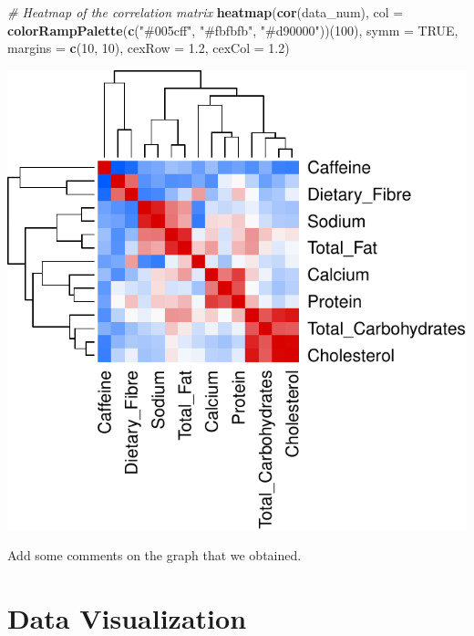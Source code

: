 \documentclass[
]{article}
\newenvironment{Shaded}{\begin{snugshade}}{\end{snugshade}}
\newcommand{\AttributeTok}[1]{\textcolor[rgb]{0.13,0.29,0.53}{#1}}
\newcommand{\CommentTok}[1]{\textcolor[rgb]{0.56,0.35,0.01}{\textit{#1}}}
\newcommand{\ConstantTok}[1]{\textcolor[rgb]{0.56,0.35,0.01}{#1}}
\newcommand{\DecValTok}[1]{\textcolor[rgb]{0.00,0.00,0.81}{#1}}
\newcommand{\FloatTok}[1]{\textcolor[rgb]{0.00,0.00,0.81}{#1}}
\newcommand{\FunctionTok}[1]{\textcolor[rgb]{0.13,0.29,0.53}{\textbf{#1}}}
\newcommand{\NormalTok}[1]{#1}
\newcommand{\StringTok}[1]{\textcolor[rgb]{0.31,0.60,0.02}{#1}}
\begin{document}
\begin{Shaded}
\begin{Highlighting}[]
\CommentTok{\# Heatmap of the correlation matrix}
\FunctionTok{heatmap}\NormalTok{(}\FunctionTok{cor}\NormalTok{(data\_num), }
        \AttributeTok{col =} \FunctionTok{colorRampPalette}\NormalTok{(}\FunctionTok{c}\NormalTok{(}\StringTok{"\#005cff"}\NormalTok{, }\StringTok{"\#fbfbfb"}\NormalTok{, }\StringTok{"\#d90000"}\NormalTok{))(}\DecValTok{100}\NormalTok{), }
        \AttributeTok{symm =} \ConstantTok{TRUE}\NormalTok{, }
        \AttributeTok{margins =} \FunctionTok{c}\NormalTok{(}\DecValTok{10}\NormalTok{, }\DecValTok{10}\NormalTok{), }
        \AttributeTok{cexRow =} \FloatTok{1.2}\NormalTok{,}
        \AttributeTok{cexCol =} \FloatTok{1.2}\NormalTok{)}
\end{Highlighting}
\end{Shaded}

\begin{center}\includegraphics{Statistical_Learning_Final_Report_files/figure-latex/correlation_analysis-2} \end{center}

Add some comments on the graph that we obtained.

\hypertarget{data-visualization}{%
\section{Data Visualization}\label{data-visualization}}
\end{document}
